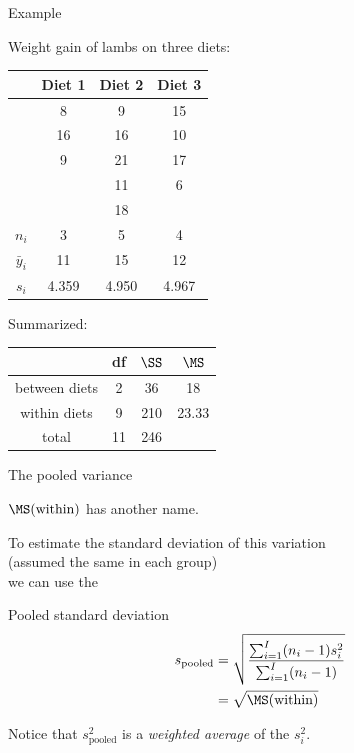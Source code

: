 \begin{frame}{Example}

    Weight gain of lambs on three diets:
    \begin{center}
        \begin{tabular}{cccc}
            & Diet 1 & Diet 2 & Diet 3 \\
            \hline
            & 8 & 9 & 15 \\
            & 16 & 16 & 10 \\
            & 9 & 21 & 17 \\
            &  & 11 & 6 \\
            &  & 18 &  \\
            \hline
            $n_i$ & 3 & 5 & 4 \\
            $\bar y_i$ & 11 & 15 & 12 \\
            $s_i$ & 4.359 & 4.950 & 4.967 \\
        \end{tabular}
    \end{center}

    \vspace{2em}

    Summarized:
    \begin{center}
        \begin{tabular}{cccc}
            & df & $\SS$ & $\MS$ \\
            \hline
            between diets & 2 & 36 & 18 \\
            within diets & 9 & 210 & 23.33 \\
            \hline
            total & 11 & 246 & \\
        \end{tabular}
    \end{center}

\end{frame}

\begin{frame}{The pooled variance}

  $\MS(\text{within})$ has another name.

  \vspace{2em}

  To \alert{estimate} the standard deviation of this variation\\
  (assumed the same in each group)\\
  we can use the
  \begin{block}{Pooled standard deviation}
    \begin{align*} 
      s_\text{pooled} &= \sqrt{ \frac{ \sum_{i=1}^I (n_i-1) s_i^2 }{ \sum_{i=1}^I (n_i-1) } }\\
      &= \sqrt{ \MS(\text{within}) }
    \end{align*}
  \end{block}

  \vspace{2em}
  Notice that $s_\text{pooled}^2$ is a \emph{weighted average} of the $s_i^2$.

\end{frame}

